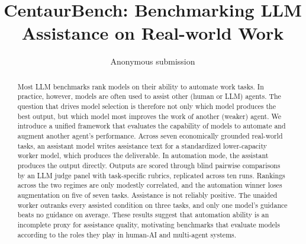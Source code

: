 \documentclass{article}
\title{CentaurBench: Benchmarking LLM Assistance on Real-world Work}
\author{Anonymous submission}
\begin{document}
\maketitle

\begin{abstract}
Most LLM benchmarks rank models on their ability to automate work tasks. In practice, however, models are often used to assist other (human or LLM) agents. The question that drives model selection is therefore not only which model produces the best output, but which model most improves the work of another (weaker) agent. We introduce a unified framework that evaluates the capability of models to automate and augment another agent's performance. Across seven economically grounded real-world tasks, an assistant model writes assistance text for a standardized lower-capacity worker model, which produces the deliverable. In automation mode, the assistant produces the output directly. Outputs are scored through blind pairwise comparisons by an LLM judge panel with task-specific rubrics, replicated across ten runs. Rankings across the two regimes are only modestly correlated, and the automation winner loses augmentation on five of seven tasks. Assistance is not reliably positive. The unaided worker outranks every assisted condition on three tasks, and only one model's guidance beats no guidance on average.  These results suggest that automation ability is an incomplete proxy for assistance quality, motivating benchmarks that evaluate models according to the roles they play in human-AI and multi-agent systems. 





\end{abstract}
\end{document}
